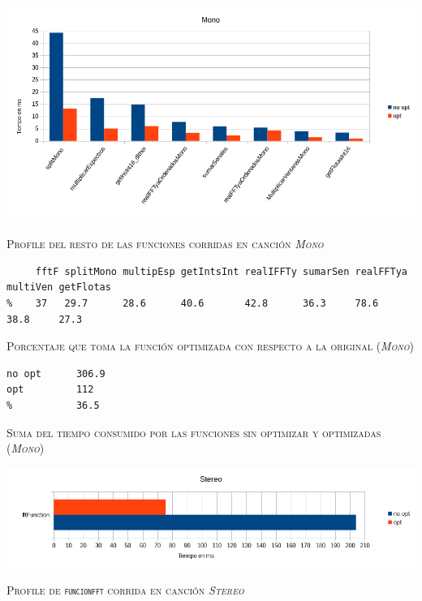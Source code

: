 \documentclass[%
    compressed,
    titlepage,
    narroweqnarray,
    inline,
    twoside,
    ]{ieee}
\begin{document}
\begin{center} 
\includegraphics[width=1.1\textwidth]{img/todasMono.png}~\\
\textsc{Profile del resto de las funciones corridas en canci\'on \textit{Mono}} \end{center}

{\small
\begin{lstlisting}
     fftF splitMono multipEsp getIntsInt realIFFTy sumarSen realFFTya multiVen getFlotas
%    37   29.7      28.6      40.6       42.8      36.3     78.6      38.8     27.3         
\end{lstlisting}
}
\begin{center} \textsc{Porcentaje que toma la funci\'on optimizada con respecto a la original (\textit{Mono})} \end{center}

{\small
\begin{lstlisting}
no opt      306.9
opt         112
%           36.5
\end{lstlisting}
}
\begin{center} \textsc{Suma del tiempo consumido por las funciones sin optimizar y optimizadas (\textit{Mono})} \end{center}



\includegraphics[width=1\textwidth]{img/fftStereo.png}
\begin{center} \textsc{Profile de \texttt{funcionfft} corrida en canci\'on \textit{Stereo}} \end{center}
\end{document}
